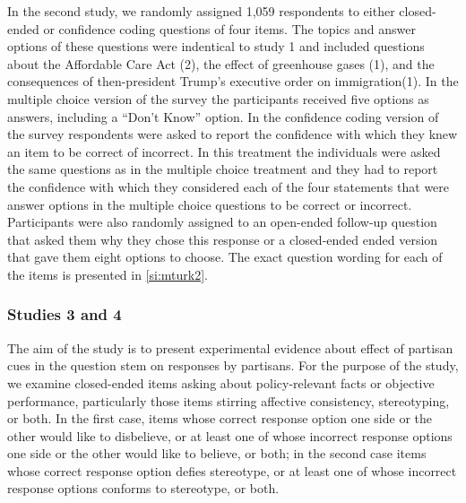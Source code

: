 \documentclass[12pt, letterpaper]{article}
\begin{document}
In the second study, we randomly assigned 1,059 respondents to either closed-ended or confidence coding questions of four items. The topics and answer options of these questions were indentical to study 1 and included questions about the Affordable Care Act (2), the effect of greenhouse gases (1), and the consequences of then-president Trump's executive order on immigration(1). In the multiple choice version of the survey the participants received five options as answers, including a ``Don't Know'' option. In the confidence coding version of the survey respondents were asked to report the confidence with which they knew an item to be correct of incorrect. In this treatment the individuals were asked the same questions as in the multiple choice treatment and they had to report the confidence with which they considered each of the four statements that were answer options in the multiple choice questions to be correct or incorrect.
Participants were also randomly assigned to an open-ended follow-up question that asked them why they chose this response or a closed-ended ended version that gave them eight options to choose. The exact question wording for each of the items is presented in
\cref{si:mturk2}.

\subsubsection*{Studies 3 and 4}

The aim of the study is to present experimental evidence about effect of partisan cues in the question stem on responses by partisans. For the purpose of the study, we examine closed-ended items asking about policy-relevant facts or objective performance, particularly those items stirring affective consistency, stereotyping, or both.  In the first case, items whose correct response option one side or the other would like to disbelieve, or at least one of whose incorrect response options one side or the other would like to believe, or both; in the second case items whose correct response option defies stereotype, or at least one of whose incorrect response options conforms to stereotype, or both.
\end{document}
